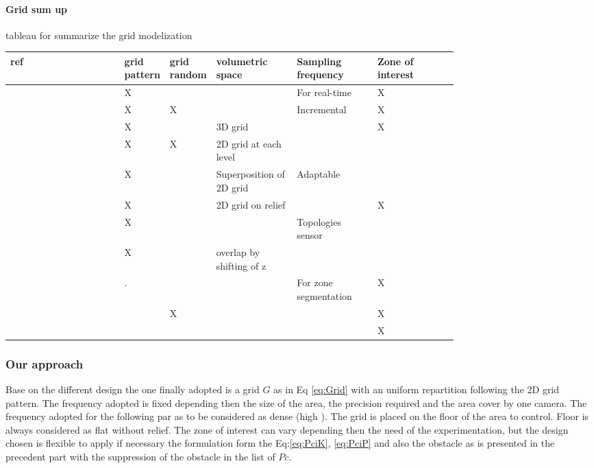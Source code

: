\paragraph*{Grid sum up}
 tableau for summarize  the grid modelization
 \begin{center}
   \begin{tabular}{ l | m{0.1\linewidth} | m{0.1\linewidth} | m{0.187\linewidth} | m{0.187\linewidth} | m{0.187\linewidth} |  }
     \hline
     ref & grid pattern & grid random  & volumetric space & Sampling frequency &Zone of interest \tabularnewline \hline 
	 [8*]   &	 X	 	&	     & 	   						  & For real-time    & X \tabularnewline   \hline 	
	 [22*]  &	 X	 	&	 X   & 	   						  & Incremental	 	 & X \tabularnewline \hline     
	 [82*]  &	 X	 	&	     &	3D grid					  &  				 & X \tabularnewline \hline
     [83*]  &	 X	 	&	 X   & 	2D grid at each level  	  &  				 &	\tabularnewline \hline
     [87*]  &	 X	 	&	     &  Superposition of 2D grid  &  	Adaptable	 &	\tabularnewline \hline
     [141*] &	 X	 	&	     & 	2D grid on relief 		  &  		 		 & X \tabularnewline \hline
     [150*] &	 X	 	&	     & 	  	 					  & Topologies sensor&	\tabularnewline \hline
     [164*] &	 X	 	&	     &overlap by shifting of z  &  				 &	\tabularnewline \hline
     [170*] &	 .	 	& 	     &		  					  &For zone 
     															segmentation 	 & X \tabularnewline \hline
     [171*] &	  	 	&	 X   & 	  	 					  &  		 	 	 & X \tabularnewline \hline
     [174*] &	  	 	&	     & 	 	 					  & 				 & X \tabularnewline \hline
           
   \end{tabular}
 \end{center}
	 
\subsubsection*{Our approach}
 Base on the different design the one finally adopted is a grid $G$ as in Eq \ref{eq:Grid} with an uniform repartition following the 2D grid pattern. The frequency adopted is fixed depending then the size of the area, the precision required and the area cover by one camera. The frequency adopted for the following par as to be considered as dense (high ).
  The grid is placed on the floor of the area to control. Floor is always considered as flat without relief. The zone of interest can vary depending then the need of the experimentation, but the  design chosen is  flexible to apply if necessary the formulation form the Eq:\ref{eq:PciK}, \ref{eq:PciP} and also the obstacle as is presented in the precedent part with the suppression of the obstacle in the list of $Pc$.

